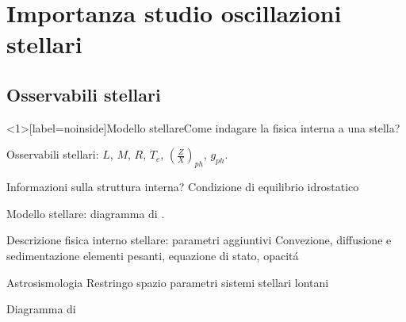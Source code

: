 
\section{Importanza studio oscillazioni stellari}

\subsection{Osservabili stellari}

\begin{frame}<1>[label=noinside]{Modello stellare}{Come indagare la fisica interna a una stella?}

\begin{block}{Osservabili stellari:}
$L$, $M$, $R$, $T_e$, $(\frac{Z}{X})_{ph}$, $g_{ph}$.
\end{block}

\begin{block}{Informazioni sulla struttura interna?} Condizione di equilibrio idrostatico
\end{block}


\begin{block}{Modello stellare: diagramma di \hr{}.}
\end{block}

\begin{block}{Descrizione fisica interno stellare: parametri aggiuntivi}
Convezione, diffusione e sedimentazione elementi pesanti, equazione di stato, opacit\'a
\end{block}

\begin{block}{Astrosismologia}
Restringo spazio parametri sistemi stellari lontani
\end{block}

\end{frame}


{ %
    \begin{frame}[plain]{Diagramma di \hr{}}
     \end{frame}
}



